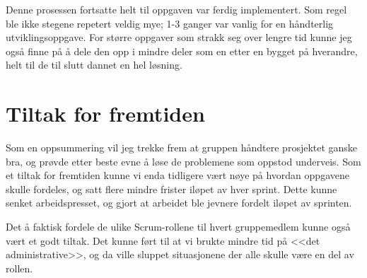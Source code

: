 \documentclass[a4paper, 12pt]{article}  %
\begin{document}
Denne prosessen fortsatte helt til oppgaven var ferdig implementert.
Som regel ble ikke stegene repetert veldig mye; 1-3 ganger var vanlig for en håndterlig utviklingsoppgave. 
For større oppgaver som strakk seg over lengre tid kunne jeg også finne på å dele den opp i mindre deler som en etter en bygget på hverandre, helt til de til slutt dannet en hel løsning.

\section{Tiltak for fremtiden}

Som en oppsummering vil jeg trekke frem at gruppen håndtere prosjektet ganske bra, og prøvde etter beste evne å løse de problemene som oppstod underveis.
Som et tiltak for fremtiden kunne vi enda tidligere vært nøye på hvordan oppgavene skulle fordeles, og satt flere mindre frister iløpet av hver sprint.
Dette kunne senket arbeidspresset, og gjort at arbeidet ble jevnere fordelt iløpet av sprinten.

Det å faktisk fordele de ulike Scrum-rollene til hvert gruppemedlem kunne også vært et godt tiltak.
Det kunne ført til at vi brukte mindre tid på <<det administrative>>, og da ville sluppet situasjonene der alle skulle være en del av rollen.


\newpage
\printbibliography[heading=bibintoc] %
\end{document}
